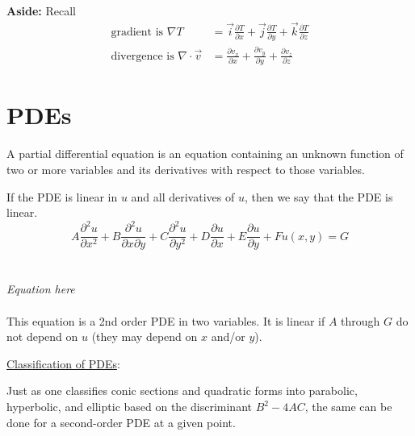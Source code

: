 \documentclass[12pt]{exam}
\begin{document}
\textbf{Aside:} Recall
%
\begin{align}
\text{gradient is } \nabla T &= \vec{i}\frac{\partial T}{\partial x} + \vec{j}\frac{\partial T}{\partial y} + \vec{k}\frac{\partial T}{\partial z} \nonumber \\
%
\text{divergence is } \nabla \cdot \vec{v} &= \frac{\partial v_x}{\partial x} + \frac{\partial v_y}{\partial y} + \frac{\partial v_z}{\partial z} \nonumber
\end{align}

\section{PDEs}

A partial differential equation is an equation containing an unknown function of two or more variables and its derivatives with respect to those variables. 

If the PDE is linear in $u$ and all derivatives of $u$, then we say that the PDE is linear.
%
\ifprintanswers
\begin{equation}
A\frac{\partial^2 u}{\partial x^2} + B\frac{\partial^2 u}{\partial x \partial  y} + C\frac{\partial^2 u}{\partial y^2} + D\frac{\partial u}{\partial x} + E\frac{\partial u}{\partial y} + Fu(x,y) = G \nonumber
\end{equation}
\else
 \\ \\ \hspace*{8em}\textit{Equation here}\\ \\
\fi
%
This equation is a 2nd order PDE in two variables. It is linear if $A$ through $G$ do not depend on $u$ (they may depend on $x$ and/or $y$). 

\vspace*{1em}
\underline{Classification of PDEs}:%

Just as one classifies conic sections and quadratic forms into parabolic, hyperbolic, and elliptic based on the discriminant $B^2 - 4AC$, the same can be done for a second-order PDE at a given point. 
\end{document}

